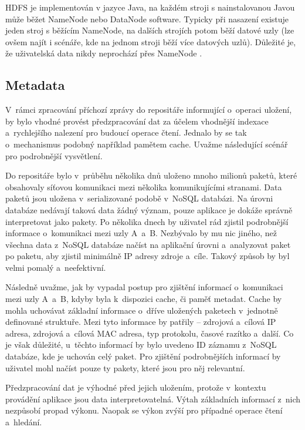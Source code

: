 HDFS je implementován v jazyce Java, na každém stroji s nainstalovanou Javou může běžet NameNode nebo DataNode software. Typicky při nasazení existuje jeden stroj s běžícím NameNode, na dalších strojích potom běží datové uzly (lze ovšem najít i scénáře, kde na jednom stroji běží více datových uzlů). Důležité je, že uživatelská data nikdy neprochází přes NameNode \cite{apacheHDFSGuide}.


\subsection{Metadata} \label{metadata}
V~rámci zpracování příchozí zprávy do repositáře informující o~operaci uložení, by bylo vhodné provést předzpracování dat za účelem vhodnější indexace a~rychlejšího nalezení pro budoucí operace čtení. Jednalo by se tak o~mechanismus podobný například pamětem cache. Uvažme následující scénář pro podrobnější vysvětlení.

Do repositáře bylo v~průběhu několika dnů uloženo mnoho milionů paketů, které obsahovaly síťovou komunikaci mezi několika komunikujícími stranami. Data paketů jsou uložena v~serializované podobě v~NoSQL databázi. Na úrovni databáze nedávají taková data žádný význam, pouze aplikace je dokáže správně interpretovat jako pakety. Po několika dnech by uživatel rád zjistil podrobnější informace o~komunikaci mezi uzly A~a~B. Nezbývalo by mu nic jiného, než všechna data z~NoSQL databáze načíst na aplikační úrovni a~analyzovat paket po paketu, aby zjistil minimálně IP adresy zdroje a~cíle. Takový způsob by byl velmi pomalý a~neefektivní.

Následně uvažme, jak by vypadal postup pro zjištění informací o~komunikaci mezi uzly A~a~B, kdyby byla k~dispozici cache, či paměť metadat. Cache by mohla uchovávat základní informace o~dříve uložených paketech v~jednotně definované struktuře. Mezi tyto informace by patřily -- zdrojová a~cílová IP adresa, zdrojová a~cílová MAC adresa, typ protokolu, časové razítko a~další. Co je však důležité, u~těchto informací by bylo uvedeno ID záznamu z~NoSQL databáze, kde je uchován celý paket. Pro zjištění podrobnějších informací by uživatel mohl načíst pouze ty pakety, které jsou pro něj relevantní.

Předzpracování dat je výhodné před jejich uložením, protože v~kontextu provádění aplikace jsou data interpretovatelná. Výtah základních informací z~nich nezpůsobí propad výkonu. Naopak se výkon zvýší pro případné operace čtení a~hledání.

